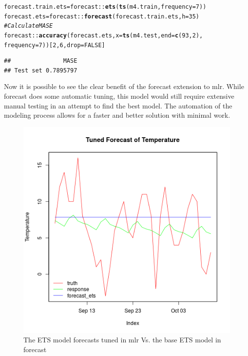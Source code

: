 \documentclass[12pt]{article}\usepackage[]{graphicx}\usepackage[]{color}
\makeatletter
\newcommand{\hlnum}[1]{\textcolor[rgb]{0.686,0.059,0.569}{#1}}%
\newcommand{\hlcom}[1]{\textcolor[rgb]{0.678,0.584,0.686}{\textit{#1}}}%
\newcommand{\hlopt}[1]{\textcolor[rgb]{0,0,0}{#1}}%
\newcommand{\hlstd}[1]{\textcolor[rgb]{0.345,0.345,0.345}{#1}}%
\newcommand{\hlkwb}[1]{\textcolor[rgb]{0.69,0.353,0.396}{#1}}%
\newcommand{\hlkwc}[1]{\textcolor[rgb]{0.333,0.667,0.333}{#1}}%
\newcommand{\hlkwd}[1]{\textcolor[rgb]{0.737,0.353,0.396}{\textbf{#1}}}%
\newenvironment{kframe}{%
 \def\at@end@of@kframe{}%
 \ifinner\ifhmode%
  \def\at@end@of@kframe{\end{minipage}}%
  \begin{minipage}{\columnwidth}%
 \fi\fi%
 \def\FrameCommand##1{\hskip\@totalleftmargin \hskip-\fboxsep
 \colorbox{shadecolor}{##1}\hskip-\fboxsep
     \hskip-\linewidth \hskip-\@totalleftmargin \hskip\columnwidth}%
 \MakeFramed {\advance\hsize-\width
   \@totalleftmargin\z@ \linewidth\hsize
   \@setminipage}}%
 {\par\unskip\endMakeFramed%
 \at@end@of@kframe}
\newenvironment{knitrout}{}{} %
\theoremstyle{definition}
\newcommand{\pkg}[1]{{\fontseries{b}\selectfont #1}}
\makeatother
\begin{document}
\singlespacing
\begin{knitrout}
\color{fgcolor}\begin{kframe}
\begin{alltt}
\hlstd{forecast.train.ets} \hlkwb{=} \hlstd{forecast}\hlopt{::}\hlkwd{ets}\hlstd{(}\hlkwd{ts}\hlstd{(m4.train,}\hlkwc{frequency} \hlstd{=} \hlnum{7}\hlstd{))}
\hlstd{forecast.ets} \hlkwb{=} \hlstd{forecast}\hlopt{::}\hlkwd{forecast}\hlstd{(forecast.train.ets,}\hlkwc{h}\hlstd{=}\hlnum{35}\hlstd{)}
\hlcom{# Calculate MASE}
\hlstd{forecast}\hlopt{::}\hlkwd{accuracy}\hlstd{(forecast.ets,} \hlkwc{x}\hlstd{=} \hlkwd{ts}\hlstd{(m4.test,} \hlkwc{end} \hlstd{=} \hlkwd{c}\hlstd{(}\hlnum{93}\hlstd{,}\hlnum{2}\hlstd{),}
                                  \hlkwc{frequency} \hlstd{=} \hlnum{7}\hlstd{))[}\hlnum{2}\hlstd{,}\hlnum{6}\hlstd{,}\hlkwc{drop}\hlstd{=}\hlnum{FALSE}\hlstd{]}
\end{alltt}
\begin{verbatim}
##               MASE
## Test set 0.7895797
\end{verbatim}
\end{kframe}
\end{knitrout}
\doublespacing

Now it is possible to see the clear benefit of the forecast extension to \pkg{mlr}. While \pkg{forecast} does some automatic tuning, this model would still require extensive manual testing in an attempt to find the best model. The automation of the modeling process allows for a faster and better solution with minimal work.



\begin{figure}[H]
  \includegraphics[width=\linewidth]{plot_ets_vs_forecast.png}
  \centering
  \caption{The ETS model forecasts tuned in \pkg{mlr} Vs. the base ETS model in forecast}
  \label{fig:mlrvsforecast}
\end{figure}
\end{document}
